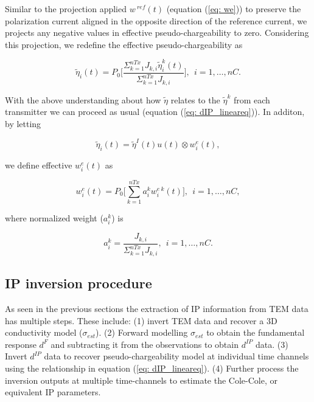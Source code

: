 \documentclass[extra,mreferee]{gji}
\newcommand{\peta}{\tilde{\eta}}
\newcommand{\dip}{d^{IP}}
\begin{document}
Similar to the projection applied $w^{\ ref}(t)$ (equation (\ref{eq: we})) to preserve the polarization current aligned in the opposite direction of the reference current, we projects any negative values in effective pseudo-chargeability to zero. 
Considering this projection, we redefine the effective pseudo-chargeability as 
\begin{linenomath*}
\begin{equation}
  \peta_i(t) = P_0\Big[\frac {\Sigma_{k=1}^{nTx} J_{k,i}\peta^k_i(t)} {\Sigma_{k=1}^{nTx} J_{k,i}}\Big], \ \ i=1, \ldots, nC.
  \label{eq: petaeff_pos}
\end{equation}
\end{linenomath*}
With the above understanding about how $\peta$ relates to the $\peta^k$ from each transmitter we can proceed as usual (equation (\ref{eq: dIP_lineareq})). 
In additon, by letting 
\begin{linenomath*}
\begin{equation}
  \peta_i(t) = \peta^I(t)u(t) \otimes w^e_i(t),
\end{equation}
\end{linenomath*}
we define effective $w^e_i(t)$ as 
\begin{linenomath*}
\begin{equation}
  w^e_i(t)= P_0\Big[\sum_{k=1}^{nTx} a^k_i w^{e \ k}_i(t)\Big], \ \ i=1, \ldots, nC,
  \label{eq: we_eff}
\end{equation}
\end{linenomath*}
where normalized weight ($a^k_i$) is 
\begin{linenomath*}
\begin{equation}
  a^k_i = \frac {J_{k,i}} {\Sigma_{k=1}^{nTx} J_{k,i}}, \ \ i=1, \ldots, nC.
  \label{eq: normalized_weights}
\end{equation}
\end{linenomath*}

\subsection{IP inversion procedure}
As seen in the previous sections the extraction of IP information from TEM data has multiple steps. These include: (1) invert TEM data and recover a 3D conductivity model ($\sigma_{est}$). 
(2) Forward modelling $\sigma_{est}$ to obtain the fundamental response $d^F$ and subtracting it from the observations to obtain $\dip$ data.
(3) Invert  $\dip$ data to recover pseudo-chargeability model at individual time channels using the relationship in equation (\ref{eq: dIP_lineareq}). 
(4) Further process the inversion outputs at multiple time-channels  to estimate the Cole-Cole, or equivalent IP parameters.
\end{document}
